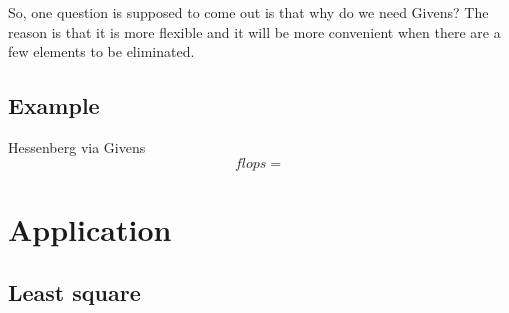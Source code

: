 So, one question is supposed to come out is that why do we need Givens? The reason is that it is more flexible and it will be more convenient when there are a few elements to be eliminated.
\subsection{Example}
Hessenberg via Givens
\newline
\begin{equation}
    flops = 
\end{equation}

\section{Application}
\subsection{Least square}